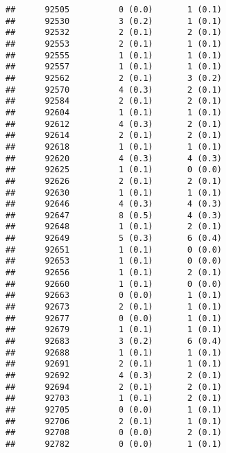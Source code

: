 \documentclass[]{article}
\begin{document}
\begin{verbatim}
##      92505          0 (0.0)       1 (0.1)                       
##      92530          3 (0.2)       1 (0.1)                       
##      92532          2 (0.1)       2 (0.1)                       
##      92553          2 (0.1)       1 (0.1)                       
##      92555          1 (0.1)       1 (0.1)                       
##      92557          1 (0.1)       1 (0.1)                       
##      92562          2 (0.1)       3 (0.2)                       
##      92570          4 (0.3)       2 (0.1)                       
##      92584          2 (0.1)       2 (0.1)                       
##      92604          1 (0.1)       1 (0.1)                       
##      92612          4 (0.3)       2 (0.1)                       
##      92614          2 (0.1)       2 (0.1)                       
##      92618          1 (0.1)       1 (0.1)                       
##      92620          4 (0.3)       4 (0.3)                       
##      92625          1 (0.1)       0 (0.0)                       
##      92626          2 (0.1)       2 (0.1)                       
##      92630          1 (0.1)       1 (0.1)                       
##      92646          4 (0.3)       4 (0.3)                       
##      92647          8 (0.5)       4 (0.3)                       
##      92648          1 (0.1)       2 (0.1)                       
##      92649          5 (0.3)       6 (0.4)                       
##      92651          1 (0.1)       0 (0.0)                       
##      92653          1 (0.1)       0 (0.0)                       
##      92656          1 (0.1)       2 (0.1)                       
##      92660          1 (0.1)       0 (0.0)                       
##      92663          0 (0.0)       1 (0.1)                       
##      92673          2 (0.1)       1 (0.1)                       
##      92677          0 (0.0)       1 (0.1)                       
##      92679          1 (0.1)       1 (0.1)                       
##      92683          3 (0.2)       6 (0.4)                       
##      92688          1 (0.1)       1 (0.1)                       
##      92691          2 (0.1)       1 (0.1)                       
##      92692          4 (0.3)       2 (0.1)                       
##      92694          2 (0.1)       2 (0.1)                       
##      92703          1 (0.1)       2 (0.1)                       
##      92705          0 (0.0)       1 (0.1)                       
##      92706          2 (0.1)       1 (0.1)                       
##      92708          0 (0.0)       2 (0.1)                       
##      92782          0 (0.0)       1 (0.1)                       

\end{verbatim}
\end{document}
